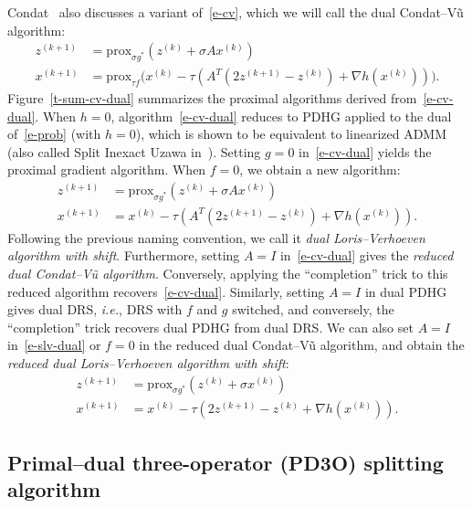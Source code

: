 \documentclass[letterpaper,11pt]{article}
\newcommand{\ie}{{\it i.e.}}
\newcommand{\prox}{\mathrm{prox}}
\begin{document}
Condat~\cite{Con:13} also discusses a variant
of~\eqref{e-cv}, which we will call the 
dual Condat--V\~u algorithm:%
\begin{subequations} \label{e-cv-dual}
\begin{align}
z^{(k+1)} &= \prox_{\sigma g^\ast} (z^{(k)}+\sigma Ax^{(k)}) \\
x^{(k+1)} &= \prox_{\tau f}
  \big(x^{(k)}-\tau (A^T(2z^{(k+1)}-z^{(k)})+\nabla h(x^{(k)})) \big).
\end{align}
\end{subequations}
Figure~\ref{t-sum-cv-dual} summarizes the proximal algorithms
derived from~\eqref{e-cv-dual}.
When $h=0$, algorithm~\eqref{e-cv-dual} reduces to PDHG
applied to the dual of~\eqref{e-prob} (with $h=0$),
which is shown to be equivalent to linearized ADMM~\cite{PaB:13}
(also called Split Inexact Uzawa in~\cite{EZC:10}).
Setting $g=0$ in~\eqref{e-cv-dual} yields the proximal gradient algorithm.
When $f=0$, we obtain a new algorithm:
\begin{subequations} \label{e-slv-dual}
\begin{align}
z^{(k+1)} &= \prox_{\sigma g^\ast} (z^{(k)}+\sigma Ax^{(k)}) \\
x^{(k+1)} &= x^{(k)}-\tau (A^T(2z^{(k+1)}-z^{(k)})+\nabla h(x^{(k)})).
\end{align}
\end{subequations}
Following the previous naming convention, we call it
\emph{dual Loris--Verhoeven algorithm with shift}.
Furthermore, setting $A=I$ in~\eqref{e-cv-dual} gives
the \emph{reduced dual Condat--V\~u algorithm}.
Conversely, applying the ``completion'' trick to this reduced algorithm
recovers~\eqref{e-cv-dual}.
Similarly, setting $A=I$ in dual PDHG gives dual DRS, \ie,
DRS with $f$ and $g$ switched,
and conversely, the ``completion'' trick recovers dual PDHG
from dual DRS.
We can also set $A=I$ in~\eqref{e-slv-dual}
or $f=0$ in the reduced dual Condat--V\~u algorithm,
and obtain the \emph{reduced dual Loris--Verhoeven algorithm with shift}:
\begin{subequations} \label{e-spg-dual}
\begin{align}
z^{(k+1)} &= \prox_{\sigma g^\ast} (z^{(k)}+\sigma x^{(k)}) \\
x^{(k+1)} &= x^{(k)}-\tau (2z^{(k+1)}-z^{(k)}+\nabla h(x^{(k)})).
\end{align}
\end{subequations}

\subsection{Primal--dual three-operator (PD3O) splitting algorithm}
\end{document}
